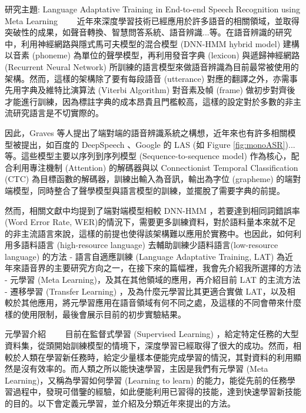\documentclass[12pt,UTF8,fntef]{article}
\begin{document}
\begin{section}{研究主題: Language Adaptative Training in End-to-end Speech Recognition using Meta Learning}
~~~~近年來深度學習技術已經應用於許多語音的相關領域，並取得突破性的成果，如聲音轉換、智慧問答系統、語音辨識...等。在語音辨識的研究中，利用神經網路與隱式馬可夫模型的混合模型 (DNN-HMM hybrid model) 建構以音素 (phoneme) 為單位的聲學模型，再利用發音字典 (lexicon) 與遞歸神經網路 (Recurrent Neural Network) 所訓練的語言模型來做語音辨識為目前最常被使用的架構。然而，這樣的架構除了要有每段語音 (utterance) 對應的翻譯之外，亦需事先用字典及維特比演算法 (Viterbi Algorithm) 對音素及幀 (frame) 做初步對齊後才能進行訓練，因為標註字典的成本昂貴且門檻較高，這樣的設定對於多數的非主流研究語言是不切實際的。

因此，Graves 等人提出了端對端的語音辨識系統之構想\cite{graves2014towards}，近年來也有許多相關模型被提出，如百度的 DeepSpeech \cite{hannun2014deep}、Google 的 LAS \cite{chan2016listen} (如 Figure \ref{fig:monoASR})...等。這些模型主要以序列到序列模型 (Sequence-to-sequence model) 作為核心，配合利用專注機制 (Attention) 的解碼器與以 Connectionist Temporal Classification (CTC) 為目標函數的解碼器，訓練出輸入為音訊，輸出為字位 (grapheme) 的端對端模型，同時整合了聲學模型與語言模型的訓練，並擺脫了需要字典的前提。

  然而，相關文獻中均提到了端對端模型相較 DNN-HMM ，若要達到相同詞錯誤率 (Word Error Rate, WER)的情況下，需要更多訓練資料，對於語料量本來就不足的非主流語言來說，這樣的前提也使得該架構難以應用於實務中。也因此，如何利用多語料語言 (high-resource language) 去輔助訓練少語料語言(low-resource language) 的方法 - 語言自適應訓練 (Language Adaptative Training, LAT) 為近年來語音界的主要研究方向之一，在接下來的篇幅裡，我會先介紹我所選擇的方法 - 元學習 (Meta Learning)，及其在其他領域的應用，再介紹目前 LAT 的主流方法 - 遷移學習 (Transfer Learning) ，及為什麼元學習比其更適合實做 LAT，以及相較於其他應用，將元學習應用在語音領域有何不同之處，及這樣的不同會帶來什麼樣的使用限制，最後會展示目前的初步實驗結果。



  \begin{subsection}{元學習介紹}
~~~~目前在監督式學習 (Supervised Learning) ，給定特定任務的大型資料集，從頭開始訓練模型的情境下，深度學習已經取得了很大的成功。然而，相較於人類在學習新任務時，給定少量樣本便能完成學習的情況，其對資料的利用顯然是沒有效率的。而人類之所以能快速學習，主因是我們有元學習 (Meta Learning)，又稱為學習如何學習 (Learning to learn) 的能力，能從先前的任務學習過程中，發現可借鑒的經驗，如此便能利用已習得的技能，達到快速學習新技能的目的。以下會定義元學習，並介紹及分類近年來提出的方法。


\end{subsection}
\end{section}
\end{document}
